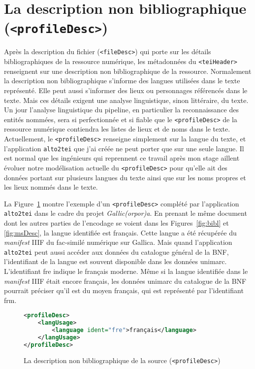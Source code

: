 \documentclass[class=article, crop=false]{standalone}
\begin{document}
\section{La description non bibliographique (\texttt{<profileDesc>})}
Après la description du fichier (\texttt{<fileDesc>}) qui porte sur les détails bibliographiques de la ressource numérique, les métadonnées du \texttt{<teiHeader>} renseignent sur une description non bibliographique de la ressource. Normalement la description non bibliographique s'informe des langues utilisées dans le texte représenté. Elle peut aussi s'informer des lieux ou personnages référencés dans le texte. Mais ces détails exigent une analyse linguistique, sinon littéraire, du texte. Un jour l'analyse linguistique du pipeline, en particulier la reconnaissance des entités nommées, sera si perfectionnée et si fiable que le \texttt{<profileDesc>} de la ressource numérique contiendra les listes de lieux et de noms dans le texte. Actuellement, le \texttt{<profileDesc>} renseigne simplement sur la langue du texte, et l'application \texttt{alto2tei} que j'ai créée ne peut porter que sur une seule langue. Il est normal que les ingénieurs qui reprennent ce travail après mon stage aillent évoluer notre modélisation actuelle du \texttt{<profileDesc>} pour qu'elle ait des données portant sur plusieurs langues du texte ainsi que sur les noms propres et les lieux nommés dans le texte.

La Figure~\ref{fig:profileDesc} montre l'exemple d'un \texttt{<profileDesc>} complété par l'application \texttt{alto2tei} dans le cadre du projet \textit{Gallic(orpor)a}. En prenant le même document dont les autres parties de l'encodage se voient dans les Figures~\ref{fig:bibl} et \ref{fig:msDesc}, la langue identifiée est français. Cette langue a été récupérée du \textit{manifest} \acrshort{IIIF} du fac-similé numérique sur Gallica. Mais quand l'application \texttt{alto2tei} peut aussi accéder aux données du catalogue général de la \acrshort{BNF}, l'identifiant de la langue est souvent disponible dans les données \Gls{unimarc}. L'identifiant \og{}fre\fg{} indique le français moderne. Même si la langue identifiée dans le \textit{manifest} \acrshort{IIIF} était encore français, les données \Gls{unimarc} du catalogue de la \acrshort{BNF} pourrait préciser qu'il est du moyen français, qui est représenté par l'identifiant \og{}frm\fg{}.

\begin{figure}[htp]
\centering
\begin{lstlisting}[language=XML]
<profileDesc>
	<langUsage>
		<language ident="fre">français</language>
	</langUsage>
</profileDesc>
\end{lstlisting}
\caption{La description non bibliographique de la source (\texttt{<profileDesc>})}
\label{fig:profileDesc}
\end{figure}
\end{document}
